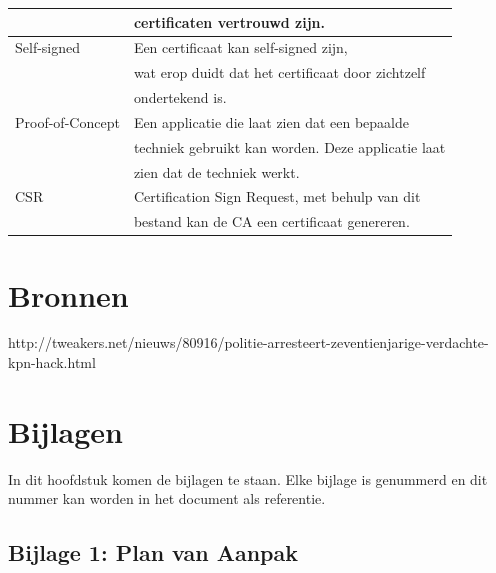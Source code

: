 \documentclass[]{article}
\begin{document}
\begin{longtable}{|| l | l ||}
                     & certificaten vertrouwd  zijn.                        \\\hline
    Self-signed      & Een certificaat kan self-signed zijn,                \\
                     & wat erop duidt dat het certificaat door zichtzelf    \\
                     & ondertekend is.                                      \\\hline
    Proof-of-Concept & Een applicatie die laat zien dat een bepaalde        \\
                     & techniek gebruikt kan worden. Deze applicatie laat   \\
                     & zien dat de techniek werkt.                   \\\hline
    CSR              & Certification Sign Request, met behulp van dit       \\
                     & bestand kan de CA een certificaat genereren.         \\\hline
\end{longtable}

\newpage
\section{Bronnen}

http://tweakers.net/nieuws/80916/politie-arresteert-zeventienjarige-verdachte-kpn-hack.html

\newpage
\section{Bijlagen}

In dit hoofdstuk komen de bijlagen te staan. Elke bijlage is genummerd en
dit nummer kan worden in het document als referentie.

\subsection{Bijlage 1: Plan van Aanpak}

\newpage
\end{document}
